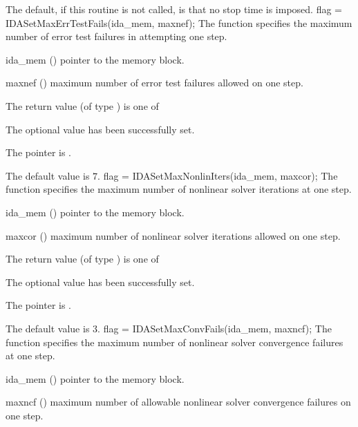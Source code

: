 {
  The default, if this routine is not called, is that no stop time is imposed.
}
{
flag = IDASetMaxErrTestFails(ida\_mem, maxnef);
}
{
  The function  specifies the
  maximum number of error test failures in attempting one step.
}
{
  \begin{args}
  \item[ida\_mem] ()
    pointer to the {\ida} memory block.
  \item[maxnef] ()
    maximum number of error test failures allowed on one step.
  \end{args}
}
{
  The return value  (of type ) is one of
  \begin{args}
  \item[\Id{IDA\_SUCCESS}] 
    The optional value has been successfully set.
  \item[\Id{IDA\_MEM\_NULL}]
    The  pointer is .
  \end{args}
}
{
  The default value is $7$.
}
{
flag = IDASetMaxNonlinIters(ida\_mem, maxcor);
}
{
  The function  specifies the maximum
  number of nonlinear solver iterations at one step.
}
{
  \begin{args}
  \item[ida\_mem] ()
    pointer to the {\ida} memory block.
  \item[maxcor] ()
    maximum number of nonlinear solver iterations allowed on one step.
  \end{args}
}
{
  The return value  (of type ) is one of
  \begin{args}
  \item[\Id{IDA\_SUCCESS}] 
    The optional value has been successfully set.
  \item[\Id{IDA\_MEM\_NULL}]
    The  pointer is .
  \end{args}
}
{
  The default value is $3$.
}
{
flag = IDASetMaxConvFails(ida\_mem, maxncf);
}
{
  The function  specifies the
  maximum number of nonlinear solver convergence failures at one step.
}
{
  \begin{args}
  \item[ida\_mem] ()
    pointer to the {\ida} memory block.
  \item[maxncf] ()
    maximum number of allowable nonlinear solver convergence failures
    on one step.
  \end{args}
}

